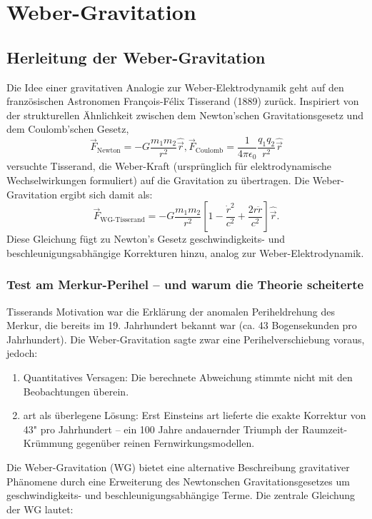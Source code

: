 \chapter{Weber-Gravitation}
\section{Herleitung der Weber-Gravitation}
Die Idee einer gravitativen Analogie zur Weber-Elektrodynamik geht auf den französischen Astronomen François-Félix Tisserand (1889) zurück. Inspiriert von der strukturellen
Ähnlichkeit zwischen dem Newton’schen Gravitationsgesetz und dem Coulomb’schen Gesetz,
\begin{equation}
    \vec{F}_{\text{Newton}} = -G \frac{m_1 m_2}{r^2} \hat{\vec{r}}, \vec{F}_{\text{Coulomb}} = \frac{1}{4 \pi \epsilon_0} \frac{q_1 q_2}{r^2} \hat{\vec{r}}
\end{equation}
versuchte Tisserand, die Weber-Kraft (ursprünglich für elektrodynamische Wechselwirkungen formuliert) auf die Gravitation zu übertragen. Die Weber-Gravitation ergibt sich damit als:
\begin{equation}
    \vec{F}_{\text{WG-Tisserand}} = -G \frac{m_1 m_2}{r^2} \left[ 1 - \frac{\dot{r}^2}{c^2} + \frac{2 r \ddot{r}}{c^2} \right] \hat{\vec{r}}.
\end{equation}
Diese Gleichung fügt zu Newton’s Gesetz geschwindigkeits- und beschleunigungsabhängige Korrekturen hinzu, analog zur Weber-Elektrodynamik.
\subsection{Test am Merkur-Perihel – und warum die Theorie scheiterte}
Tisserands Motivation war die Erklärung der anomalen Periheldrehung des Merkur, die bereits im 19. Jahrhundert bekannt war (ca. 43 Bogensekunden pro Jahrhundert).
Die Weber-Gravitation sagte zwar eine Perihelverschiebung voraus, jedoch:
\begin{enumerate}
    \item Quantitatives Versagen: Die berechnete Abweichung stimmte nicht mit den Beobachtungen überein.
    \item \gls{art} als überlegene Lösung: Erst Einsteins \gls{art} lieferte die exakte Korrektur von 43" pro Jahrhundert – ein 100 Jahre andauernder Triumph der
    Raumzeit-Krümmung gegenüber reinen Fernwirkungsmodellen.
\end{enumerate}

Die Weber-Gravitation (WG) bietet eine alternative Beschreibung gravitativer Phänomene durch eine Erweiterung des Newtonschen Gravitationsgesetzes um
geschwindigkeits- und beschleunigungsabhängige Terme. Die zentrale Gleichung der WG lautet:

